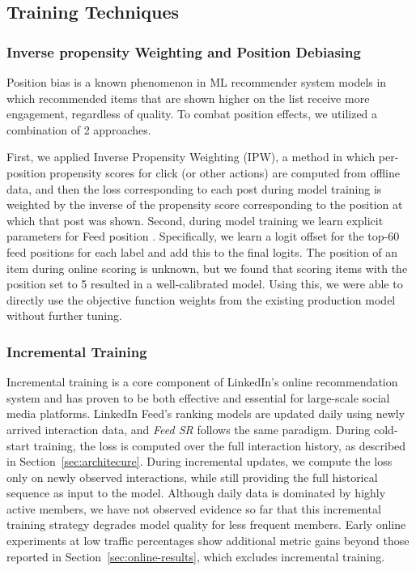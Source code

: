 \documentclass[sigconf]{acmart}
\newcommand{\systemname}{\textit{Feed SR}}
\begin{document}
\subsection{Training Techniques}

\subsubsection{Inverse propensity Weighting and Position Debiasing}

Position bias is a known phenomenon in ML recommender system models in which recommended items that are shown higher on the list receive more engagement, regardless of quality. To combat position effects, we utilized a combination of 2 approaches.

First, we applied Inverse Propensity Weighting (IPW), a method in which per-position propensity scores for click (or other actions) are computed from offline data, and then the loss corresponding to each post during model training is weighted by the inverse of the propensity score corresponding to the position at which that post was shown. Second, during model training we learn explicit parameters for Feed position  \cite{zhao2019recommending}. Specifically, we learn a logit offset for the top-60 feed positions for each label and add this to the final logits. The position of an item during online scoring is unknown, but we found that scoring items with the position set to 5 resulted in a well-calibrated model. Using this, we were able to directly use the objective function weights from the existing production model without further tuning.

\subsubsection{Incremental Training}\label{sec:incremental-training}
Incremental training is a core component of LinkedIn’s online recommendation system and has proven to be both effective and essential for large-scale social media platforms. LinkedIn Feed’s ranking models are updated daily using newly arrived interaction data, and {\systemname} follows the same paradigm. During cold-start training, the loss is computed over the full interaction history, as described in Section~\ref{sec:architecure}. During incremental updates, we compute the loss only on newly observed interactions, while still providing the full historical sequence as input to the model. Although daily data is dominated by highly active members, we have not observed evidence so far that this incremental training strategy degrades model quality for less frequent members. Early online experiments at low traffic percentages show additional metric gains beyond those reported in Section~\ref{sec:online-results}, which excludes incremental training.
\end{document}
